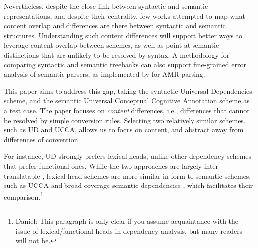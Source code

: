 \documentclass[11pt,a4paper]{article}
\newcommand{\daniel}[1]{\footnote{\color{blue}Daniel: #1}}
\begin{document}
  Nevertheless, despite the close link between syntactic and semantic representations,
  and despite their centrality, few works attempted to map what content overlap and differences
  are there between syntactic and semantic structures.
   Understanding such content differences will support better ways to leverage content overlap
   between schemes, as well as point at semantic distinctions that are unlikely to be resolved by syntax.
   A methodology for comparing syntactic and semantic treebanks can also support fine-grained error analysis 
   of semantic parsers, as implemented by \citet{szubert2018structured} for AMR parsing.
   
   This paper aims to address this gap, taking the syntactic Universal Dependencies scheme,
  and the semantic Universal Conceptual Cognitive Annotation \cite[UCCA; ][]{abend2013universal} scheme
  as a test case. 
  The paper focuses on {\it content} differences, i.e., differences that cannot be resolved by simple
  conversion rules. Selecting two relatively similar schemes, such as UD and UCCA, allows
  us to focus on content, and abstract away from differences of convention.
  
  For instance, UD strongly prefers lexical heads,
   unlike other dependency schemes that prefer functional ones.
  While the two approaches are largely inter-translatable
   \cite{Schwartz:12}, lexical head schemes are more similar in form to semantic schemes,
   such as UCCA and broad-coverage semantic dependencies \cite{oepen2016towards},
   which facilitates their comparison.\daniel{This paragraph is only clear if you assume acquaintance
   with the issue of lexical/functional heads in dependency analysis, but many readers will not be.}


  
\end{document}
